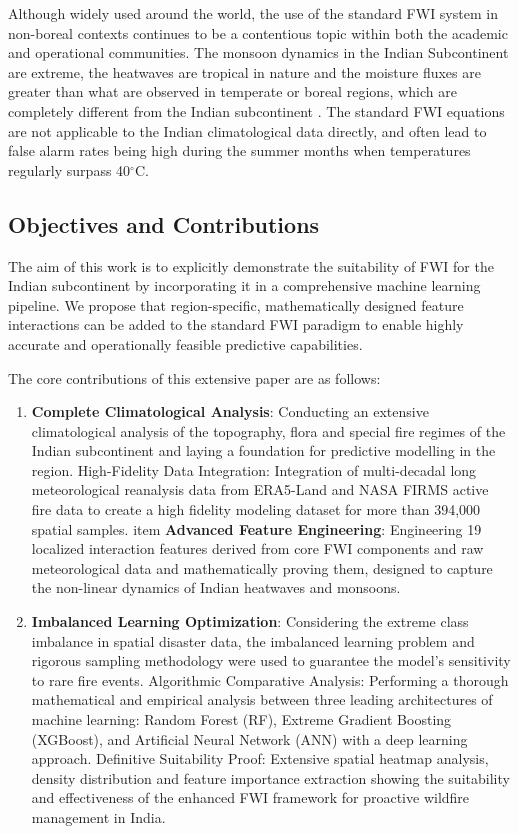 \documentclass[journal, 10pt, twocolumn]{IEEEtran}
\begin{document}
Although widely used around the world, the use of the standard FWI system in non-boreal contexts continues to be a contentious topic within both the academic and operational communities. The monsoon dynamics in the Indian Subcontinent are extreme, the heatwaves are tropical in nature and the moisture fluxes are greater than what are observed in temperate or boreal regions, which are completely different from the Indian subcontinent \cite{b9}. The standard FWI equations are not applicable to the Indian climatological data directly, and often lead to false alarm rates being high during the summer months when temperatures regularly surpass 40$^\circ$C.

\subsection{Objectives and Contributions}
The aim of this work is to explicitly demonstrate the suitability of FWI for the Indian subcontinent by incorporating it in a comprehensive machine learning pipeline. We propose that region-specific, mathematically designed feature interactions can be added to the standard FWI paradigm to enable highly accurate and operationally feasible predictive capabilities. 

The core contributions of this extensive paper are as follows:
\begin{enumerate}
    \item \textbf{Complete Climatological Analysis}: Conducting an extensive climatological analysis of the topography, flora and special fire regimes of the Indian subcontinent and laying a foundation for predictive modelling in the region.
    High-Fidelity Data Integration: Integration of multi-decadal long meteorological reanalysis data from ERA5-Land and NASA FIRMS active fire data to create a high fidelity modeling dataset for more than 394,000 spatial samples.
    item \textbf{Advanced Feature Engineering}: Engineering 19 localized interaction features derived from core FWI components and raw meteorological data and mathematically proving them, designed to capture the non-linear dynamics of Indian heatwaves and monsoons.
    \item \textbf{Imbalanced Learning Optimization}: Considering the extreme class imbalance in spatial disaster data, the imbalanced learning problem and rigorous sampling methodology were used to guarantee the model's sensitivity to rare fire events.
    Algorithmic Comparative Analysis: Performing a thorough mathematical and empirical analysis between three leading architectures of machine learning: Random Forest (RF), Extreme Gradient Boosting (XGBoost), and Artificial Neural Network (ANN) with a deep learning approach.
    Definitive Suitability Proof: Extensive spatial heatmap analysis, density distribution and feature importance extraction showing the suitability and effectiveness of the enhanced FWI framework for proactive wildfire management in India.
\end{enumerate}
\end{document}
